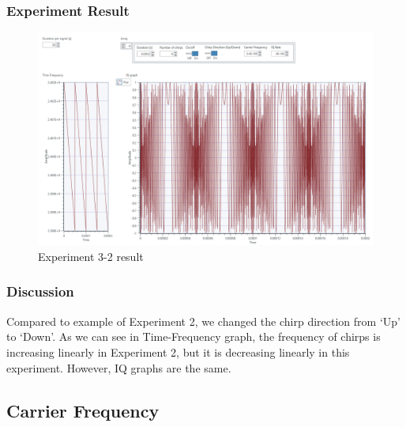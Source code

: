     \subsubsection*{Experiment Result}
    \vspace{-4mm}  
    \begin{figure}[!h]\raggedleft
    \hspace{15mm}
		\includegraphics[width=.95\textwidth]{image/week03/3-2-1.png}
		\caption{\footnotesize Experiment 3-2 result}
		\vspace{-10pt}
    \end{figure}
    
    \subsubsection*{Discussion}
    Compared to example of Experiment 2, we changed the chirp direction from ‘Up’ to ‘Down’. As we can see in Time-Frequency graph, the frequency of chirps is increasing linearly in Experiment 2, but it is decreasing linearly in this experiment. However, IQ graphs are the same. \\
\clearpage
    
    
\subsection{Carrier Frequency}
    
